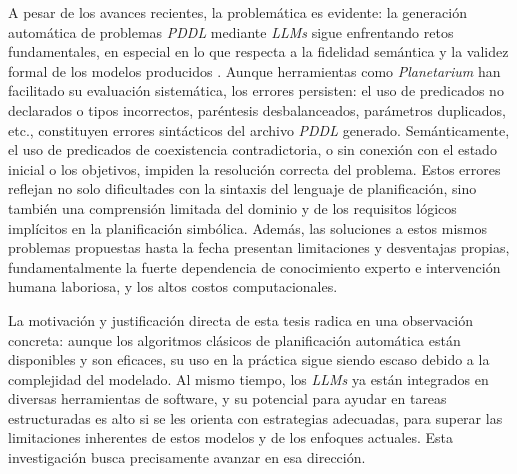 A pesar de los avances recientes, la problemática es evidente: la generación automática de problemas \textit{PDDL} mediante \textit{LLMs} sigue enfrentando retos fundamentales, en especial en lo que respecta a la fidelidad semántica y la validez formal de los modelos producidos \parencite{zuo2024planetarium}. Aunque herramientas como \textit{Planetarium} han facilitado su evaluación sistemática, los errores persisten: el uso de predicados no declarados o tipos incorrectos, paréntesis desbalanceados, parámetros duplicados, etc., constituyen errores sintácticos del archivo \textit{PDDL} generado. Semánticamente, el uso de predicados de coexistencia contradictoria, o sin conexión con el estado inicial o los objetivos, impiden la resolución correcta del problema. Estos errores reflejan no solo dificultades con la sintaxis del lenguaje de planificación, sino también una comprensión limitada del dominio y de los requisitos lógicos implícitos en la planificación simbólica. Además, las soluciones a estos mismos problemas propuestas hasta la fecha presentan limitaciones y desventajas propias, fundamentalmente la fuerte dependencia de conocimiento experto e intervención humana laboriosa, y los altos costos computacionales.

La motivación y justificación directa de esta tesis radica en una observación concreta: aunque los algoritmos clásicos de planificación automática están disponibles y son eficaces, su uso en la práctica sigue siendo escaso debido a la complejidad del modelado. Al mismo tiempo, los \textit{LLMs} ya están integrados en diversas herramientas de software, y su potencial para ayudar en tareas estructuradas es alto si se les orienta con estrategias adecuadas, para superar las limitaciones inherentes de estos modelos y de los enfoques actuales. Esta investigación busca precisamente avanzar en esa dirección.

